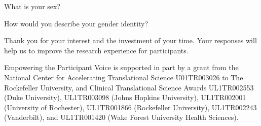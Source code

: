 \documentclass[english,pagemark,stamp,oneside,print_questionnaire_id]{sdapsclassic}
\begin{document}
\begin{questionnaire}
\begin{Form}
                        \begin{optionquestion}[singlechoice,cols=1]{What is your sex?}\end{optionquestion}
                        \begin{optionquestion}[singlechoice,cols=1]{How would you describe your gender identity?}\end{optionquestion}
                    \begin{info}
                        Thank you for your interest and the investment of your time. Your responses will help us to improve the research experience for participants.

Empowering the Participant Voice is supported in part by a grant from the National Center for Accelerating Translational Science U01TR003026 to The Rockefeller University, and Clinical Translational Science Awards UL1TR002553 (Duke University), UL1TR003098 (Johns Hopkins University),  UL1TR002001 (University of Rochester), UL1TR001866 (Rockefeller University), UL1TR002243 (Vanderbilt), and UL1TR001420 (Wake Forest University Health Sciences).
                    \end{info}
                \end{Form}
                \end{questionnaire}
            
\end{document}
